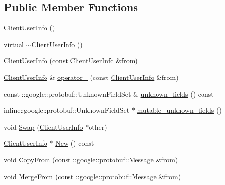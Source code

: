 \subsection*{Public Member Functions}
\begin{DoxyCompactItemize}
\item 
\hyperlink{class_i_m_1_1_base_define_1_1_client_user_info_ad386267f8d291b1dd3fa88dab8af117c}{Client\+User\+Info} ()
\item 
virtual \hyperlink{class_i_m_1_1_base_define_1_1_client_user_info_a90f80ba5430f8c028b157a6fe2a4ffc2}{$\sim$\+Client\+User\+Info} ()
\item 
\hyperlink{class_i_m_1_1_base_define_1_1_client_user_info_a2a4b3ba7e2da19b7e6f7bc9d2daa5d42}{Client\+User\+Info} (const \hyperlink{class_i_m_1_1_base_define_1_1_client_user_info}{Client\+User\+Info} \&from)
\item 
\hyperlink{class_i_m_1_1_base_define_1_1_client_user_info}{Client\+User\+Info} \& \hyperlink{class_i_m_1_1_base_define_1_1_client_user_info_a49509ca610cf479d6628b4b178815aaf}{operator=} (const \hyperlink{class_i_m_1_1_base_define_1_1_client_user_info}{Client\+User\+Info} \&from)
\item 
const \+::google\+::protobuf\+::\+Unknown\+Field\+Set \& \hyperlink{class_i_m_1_1_base_define_1_1_client_user_info_a85e8754fd9aeffff25e73b01f9e52a3f}{unknown\+\_\+fields} () const 
\item 
inline\+::google\+::protobuf\+::\+Unknown\+Field\+Set $\ast$ \hyperlink{class_i_m_1_1_base_define_1_1_client_user_info_aa386b34cc2786ce6f630c27611e8fbde}{mutable\+\_\+unknown\+\_\+fields} ()
\item 
void \hyperlink{class_i_m_1_1_base_define_1_1_client_user_info_ae970d642dfb4d679931bcdd38e332889}{Swap} (\hyperlink{class_i_m_1_1_base_define_1_1_client_user_info}{Client\+User\+Info} $\ast$other)
\item 
\hyperlink{class_i_m_1_1_base_define_1_1_client_user_info}{Client\+User\+Info} $\ast$ \hyperlink{class_i_m_1_1_base_define_1_1_client_user_info_a8de2beab8ef90b90b01a06cc194b50f8}{New} () const 
\item 
void \hyperlink{class_i_m_1_1_base_define_1_1_client_user_info_a03baeefbb7eec58a3efbbcbe19dc4766}{Copy\+From} (const \+::google\+::protobuf\+::\+Message \&from)
\item 
void \hyperlink{class_i_m_1_1_base_define_1_1_client_user_info_ac2e960b94240bfeddedcd69628c8f0b0}{Merge\+From} (const \+::google\+::protobuf\+::\+Message \&from)
\item 

\end{DoxyCompactItemize}
